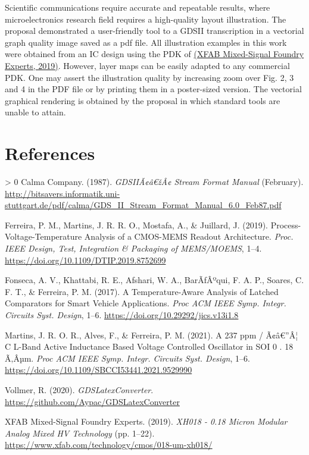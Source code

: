 \documentclass[10pt,a4paper,onecolumn]{article}
\let\textttOrig=\texttt
\def\texttt#1{\expandafter\textttOrig{\seqsplit{#1}}}
\newlength{\cslhangindent}
\newenvironment{CSLReferences}[3] %
 {%
  \setlength{\parindent}{0pt}
  \ifodd #1 \everypar{\setlength{\hangindent}{\cslhangindent}}\ignorespaces\fi
  \ifnum #2 > 0
  \setlength{\parskip}{#2\baselineskip}
  \fi
 }%
 {}
\let\addcontentslineOrig=\addcontentsline
\def\addcontentsline#1#2#3{\bgroup
  \let\texttt=\textttOrig\addcontentslineOrig{#1}{#2}{#3}\egroup}
\begin{document}
Scientific communications require accurate and repeatable results, where
microelectronics research field requires a high-quality layout
illustration. The proposal demonstrated a user-friendly tool to a GDSII
transcription in a vectorial graph quality image saved as a pdf file.
All illustration examples in this work were obtained from an IC design
using the PDK of \hyperlink{ref-XFAB2019}{(XFAB Mixed-Signal Foundry Experts, 2019)}. However,
layer maps can be easily adapted to any commercial PDK. One may assert
the illustration quality by increasing zoom over Fig. 2, 3 and 4 in the
PDF file or by printing them in a poster-sized version. The vectorial
graphical rendering is obtained by the proposal in which standard tools
are unable to attain.

\hypertarget{references}{%
\section*{References}\label{references}}

\hypertarget{refs}{}
\begin{CSLReferences}{1}{0}
\leavevmode\hypertarget{ref-Calma1987}{}%
Calma Company. (1987). \emph{{GDSIIÃ¢â€žÂ¢ Stream Format Manual}} (February).
\url{http://bitsavers.informatik.uni-stuttgart.de/pdf/calma/GDS_II_Stream_Format_Manual_6.0_Feb87.pdf}

\leavevmode\hypertarget{ref-Ferreira2019b}{}%
Ferreira, P. M., Martins, J. R. R. O., Mostafa, A., \& Juillard, J.
(2019). {Process-Voltage-Temperature Analysis of a CMOS-MEMS Readout
Architecture}. \emph{Proc. IEEE Design, Test, Integration \& Packaging
of MEMS/MOEMS}, 1--4. \url{https://doi.org/10.1109/DTIP.2019.8752699}

\leavevmode\hypertarget{ref-Fonseca2017}{}%
Fonseca, A. V., Khattabi, R. E., Afshari, W. A., BarÃƒÂºqui, F. A. P.,
Soares, C. F. T., \& Ferreira, P. M. (2017). {A Temperature-Aware
Analysis of Latched Comparators for Smart Vehicle Applications}.
\emph{Proc ACM IEEE Symp. Integr. Circuits Syst. Design}, 1--6.
\url{https://doi.org/10.29292/jics.v13i1.8}

\leavevmode\hypertarget{ref-Martins2021}{}%
Martins, J. R. O. R., Alves, F., \& Ferreira, P. M. (2021). {A 237 ppm /
Ã¢â€”Â¦ C L-Band Active Inductance Based Voltage Controlled Oscillator in SOI
0 . 18 Ã‚Âµm}. \emph{Proc ACM IEEE Symp. Integr. Circuits Syst. Design},
1--6. \url{https://doi.org/10.1109/SBCCI53441.2021.9529990}

\leavevmode\hypertarget{ref-Vollmer2020}{}%
Vollmer, R. (2020). \emph{{GDSLatexConverter}}.
\url{https://github.com/Aypac/GDSLatexConverter}

\leavevmode\hypertarget{ref-XFAB2019}{}%
XFAB Mixed-Signal Foundry Experts. (2019). \emph{{XH018 - 0.18 Micron
Modular Analog Mixed HV Technology}} (pp. 1--22).
\url{https://www.xfab.com/technology/cmos/018-um-xh018/}

\end{CSLReferences}
\end{document}
